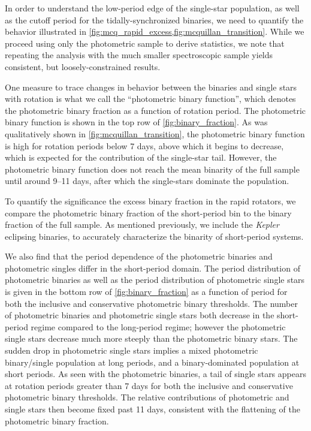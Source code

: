 \documentclass[twocolumn]{aastex6}
\newcommand{\Kepler}{\mbox{\textit{Kepler}}}
\begin{document}
In order to understand the low-period edge of the single-star population, as
well as the cutoff period for the tidally-synchronized binaries, we need to
quantify the behavior illustrated in
\cref{fig:mcq_rapid_excess,fig:mcquillan_transition}. While we proceed
using only the photometric sample to derive statistics, we note that repeating
the analysis with the much smaller spectroscopic sample yields consistent, but
loosely-constrained results.

One measure to trace
changes in behavior between the binaries and single stars with rotation is 
what we call the ``photometric binary function'', which denotes the 
photometric binary fraction as a function of rotation period. The photometric 
binary function is shown in the top row of \cref{fig:binary_fraction}. As was 
qualitatively shown in \cref{fig:mcquillan_transition}, the photometric binary
function is high for rotation periods below 7 days, above which it begins to
decrease, which is expected for the contribution of the
single-star tail. However, the photometric binary function does not reach the 
mean binarity of the full sample until around 9--11 days, after which the 
single-stars dominate the population.

To quantify the significance the excess binary fraction in the rapid rotators, 
we compare the photometric binary fraction of the short-period bin to the
binary fraction of the full sample. As mentioned previously, we include the 
\Kepler{} eclipsing binaries, to accurately characterize the binarity of
short-period systems.

We also find that the period dependence of the photometric binaries and
photometric singles differ in the short-period domain. The period distribution
of photometric binaries as well as the period distribution of photometric 
single stars is given in the bottom row of \cref{fig:binary_fraction} as a 
function of period for both the inclusive and 
conservative photometric binary thresholds. The number of photometric binaries 
and photometric single stars both decrease in the short-period regime compared to the 
long-period regime; however the photometric single stars decrease much more 
steeply than the photometric binary stars. The sudden drop in photometric 
single stars implies a mixed photometric binary/single population at long 
periods, and a binary-dominated population at short periods. As seen with the
photometric binaries, a tail of single stars appears at rotation periods 
greater than 7 days for both the inclusive and conservative photometric binary 
thresholds. The relative contributions of photometric and single stars then 
become fixed past 11 days, consistent with the flattening of the photometric 
binary fraction. 
\end{document}
